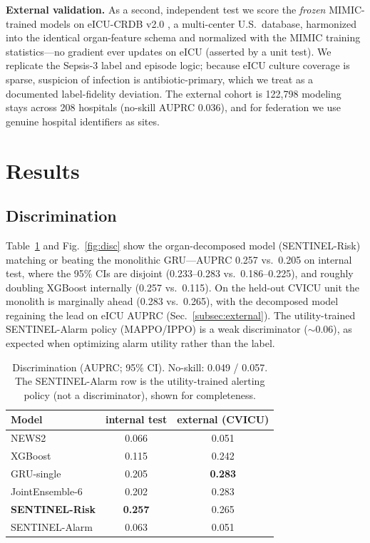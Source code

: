 \documentclass[conference]{IEEEtran}
\begin{document}
\textbf{External validation.} As a second, independent test we score the
\emph{frozen} MIMIC-trained models on eICU-CRDB v2.0 \cite{pollard2018eicu}, a
multi-center U.S.\ database, harmonized into the identical organ-feature schema and
normalized with the MIMIC training statistics---no gradient ever updates on eICU
(asserted by a unit test). We replicate the Sepsis-3 label and episode logic; because
eICU culture coverage is sparse, suspicion of infection is antibiotic-primary, which
we treat as a documented label-fidelity deviation. The external cohort is 122{,}798
modeling stays across 208 hospitals (no-skill AUPRC 0.036), and for federation we use
genuine hospital identifiers as sites.

\section{Results}
\subsection{Discrimination}
Table~\ref{tab:disc} and Fig.~\ref{fig:disc} show the organ-decomposed model
(SENTINEL-Risk) matching or beating the monolithic GRU---AUPRC 0.257 vs.\ 0.205 on
internal test, where the 95\% CIs are disjoint (0.233--0.283 vs.\ 0.186--0.225), and
roughly doubling XGBoost internally (0.257 vs.\ 0.115). On the held-out CVICU unit the
monolith is marginally ahead (0.283 vs.\ 0.265), with the decomposed model regaining
the lead on eICU AUPRC (Sec.~\ref{subsec:external}). The utility-trained SENTINEL-Alarm
policy (MAPPO/IPPO) is a weak discriminator ($\sim$0.06), as expected when optimizing
alarm utility rather than the label.

\begin{table}[t]
\caption{Discrimination (AUPRC; 95\% CI). No-skill: 0.049 / 0.057. The SENTINEL-Alarm
row is the utility-trained alerting policy (not a discriminator), shown for
completeness.}
\label{tab:disc}
\centering\small
\begin{tabular}{lcc}
\toprule
Model & internal test & external (CVICU) \\
\midrule
NEWS2 & 0.066 & 0.051 \\
XGBoost & 0.115 & 0.242 \\
GRU-single & 0.205 & \textbf{0.283} \\
JointEnsemble-6 & 0.202 & 0.283 \\
\textbf{SENTINEL-Risk} & \textbf{0.257} & 0.265 \\
SENTINEL-Alarm & 0.063 & 0.051 \\
\bottomrule
\end{tabular}
\end{table}
\end{document}
